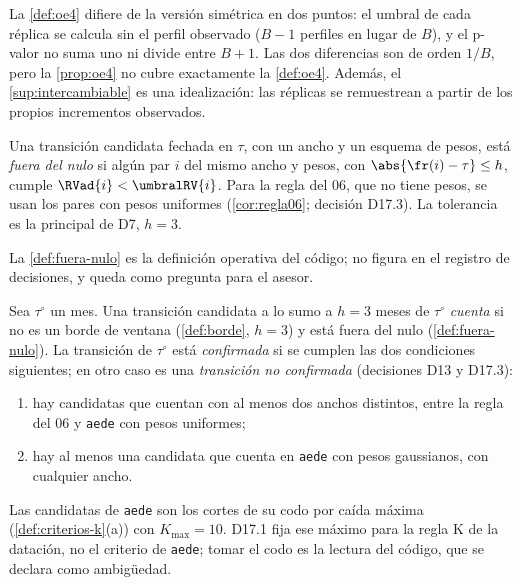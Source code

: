 \begin{observacion}\label{obs:oe4}
La \cref{def:oe4} difiere de la versión simétrica en dos puntos: el umbral de cada réplica se
calcula sin el perfil observado ($B-1$ perfiles en lugar de $B$), y el p-valor no suma uno ni
divide entre $B+1$. Las dos diferencias son de orden $1/B$, pero la \cref{prop:oe4} no cubre
exactamente la \cref{def:oe4}. Además, el \cref{sup:intercambiable} es una idealización: las
réplicas se remuestrean a partir de los propios incrementos observados.
\end{observacion}

\begin{definicion}\label{def:fuera-nulo}
Una transición candidata fechada en $\tau$, con un ancho y un esquema de pesos, está \emph{fuera del
nulo} si algún par $i$ del mismo ancho y pesos, con $\abs{\fr(i)-\tau}\le h$, cumple
$\RVad{i}<\umbralRV{i}$. Para la regla del 06, que no tiene pesos, se usan los pares con pesos
uniformes (\cref{cor:regla06}; decisión D17.3). La tolerancia es la principal de D7, $h=3$.
\end{definicion}

La \cref{def:fuera-nulo} es la definición operativa del código; no figura en el registro de
decisiones, y queda como pregunta para el asesor.

\begin{definicion}\label{def:confirmada}
Sea $\tau^\circ$ un mes. Una transición candidata a lo sumo a $h=3$ meses de $\tau^\circ$ \emph{cuenta} si no es
un borde de ventana (\cref{def:borde}, $h=3$) y está fuera del nulo (\cref{def:fuera-nulo}). La
transición de $\tau^\circ$ está \emph{confirmada} si se cumplen las dos condiciones siguientes; en otro
caso es una \emph{transición no confirmada} (decisiones D13 y D17.3):
\begin{enumerate}[label=(\alph*)]
  \item hay candidatas que cuentan con al menos dos anchos distintos, entre la regla del 06 y
    \texttt{aede} con pesos uniformes;
  \item hay al menos una candidata que cuenta en \texttt{aede} con pesos gaussianos, con cualquier
    ancho.
\end{enumerate}
\end{definicion}

Las candidatas de \texttt{aede} son los cortes de su codo por caída máxima
(\cref{def:criterios-k}(a)) con $K_{\max}=10$. D17.1 fija ese máximo para la regla K de la
datación, no el criterio de \texttt{aede}; tomar el codo es la lectura del código, que se declara
como ambigüedad.

